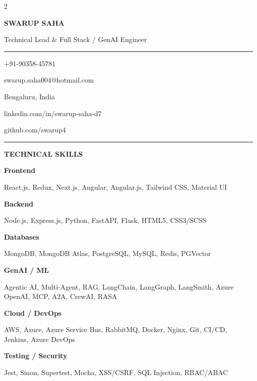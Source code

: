 \documentclass[10pt,a4paper]{article}
\newcommand{\sideheading}[1]{%
  \vspace{5pt}
  {\fontsize{9.5}{11}\bfseries\color{accent}#1}\par
  \vspace{2pt}
}
\newcommand{\sideitem}[2]{%
  {\fontsize{8.3}{10}\bfseries\color{white}#1}\par
  {\fontsize{8}{10}\color{white}#2}\par
  \vspace{3pt}
}
\newcommand{\contact}[2]{%
  {\color{white}\fontsize{8.3}{10}\selectfont #1}\quad
  {\color{white}\fontsize{8}{10}\selectfont #2}\par
  \vspace{4pt}
}
\begin{document}
\setlength{\columnsep}{0.28in}

\begin{paracol}{2}

\colorbox{sidebar}{%
\begin{minipage}[t][10.85in][t]{\dimexpr\linewidth-2\fboxsep\relax}
\raggedright

\vspace{12pt}

{\fontsize{22}{24}\bfseries\color{white} SWARUP SAHA}\par
\vspace{3pt}
{\fontsize{9.5}{12}\color{white}
Technical Lead \& Full Stack / GenAI Engineer}\par

\vspace{10pt}
\textcolor{accent}{\rule{\linewidth}{0.8pt}}
\vspace{8pt}

\contact{\faPhone}{+91-90358-45781}
\contact{\faEnvelope}{swarup.saha004@hotmail.com}
\contact{\faMapMarker*}{Bengaluru, India}
\contact{\faLinkedin}{linkedin.com/in/swarup-saha-d7}
\contact{\faGithub}{github.com/swarup4}

\vspace{3pt}
\textcolor{accent}{\rule{\linewidth}{0.5pt}}

\sideheading{TECHNICAL SKILLS}

\sideitem{Frontend}{React.js, Redux, Next.js, Angular, Angular.js, Tailwind CSS, Material UI}

\sideitem{Backend}{Node.js, Express.js, Python, FastAPI, Flask, HTML5, CSS3/SCSS}

\sideitem{Databases}{MongoDB, MongoDB Atlas, PostgreSQL, MySQL, Redis, PGVector}

\sideitem{GenAI / ML}{Agentic AI, Multi-Agent, RAG, LangChain, LangGraph, LangSmith, Azure OpenAI, MCP, A2A, CrewAI, RASA}

\sideitem{Cloud / DevOps}{AWS, Azure, Azure Service Bus, RabbitMQ, Docker, Nginx, Git, CI/CD, Jenkins, Azure DevOps}

\sideitem{Testing / Security}{Jest, Sinon, Supertest, Mocha, XSS/CSRF, SQL Injection, RBAC/ABAC}


\end{minipage}}
\end{paracol}
\end{document}
